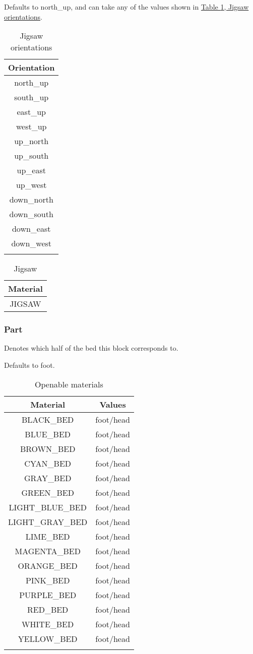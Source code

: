 Defaults to north\_up, and can take any of the values shown in \hyperref[ab:jigsaw]{Table \ref{ab:jigsaw}, Jigsaw orientations}.

\begin{longtable}{ |c| }
	\hline
	Orientation \\
	\hline
	\endhead
	north\_up \\
	south\_up \\
	east\_up \\
	west\_up \\
	\hline
	up\_north \\
	up\_south \\
	up\_east \\
	up\_west \\
	\hline
	down\_north \\
	down\_south \\
	down\_east \\
	down\_west \\
	\hline
	\caption{Jigsaw orientations}
	\label{ab:jigsaw}
\end{longtable}

\begin{table}[H]
	\centering
	\begin{tabular}{ |c| }
		\hline
		Material \\
		\hline
		JIGSAW \\
		\hline
	\end{tabular}
	\caption{Jigsaw}
\end{table}

\subsubsection{Part}
Denotes which half of the bed this block corresponds to.

Defaults to foot.

\begin{longtable}{ |c|c| }
	\hline
	Material & Values \\
	\hline
	\endhead
	BLACK\_BED & foot/head \\
	BLUE\_BED & foot/head \\
	BROWN\_BED & foot/head \\
	CYAN\_BED & foot/head \\
	GRAY\_BED & foot/head \\
	GREEN\_BED & foot/head \\
	LIGHT\_BLUE\_BED & foot/head \\
	LIGHT\_GRAY\_BED & foot/head \\
	LIME\_BED & foot/head \\
	MAGENTA\_BED & foot/head \\
	ORANGE\_BED & foot/head \\
	PINK\_BED & foot/head \\
	PURPLE\_BED & foot/head \\
	RED\_BED & foot/head \\
	WHITE\_BED & foot/head \\
	YELLOW\_BED & foot/head \\
	\hline
	\caption{Openable materials}
\end{longtable}

